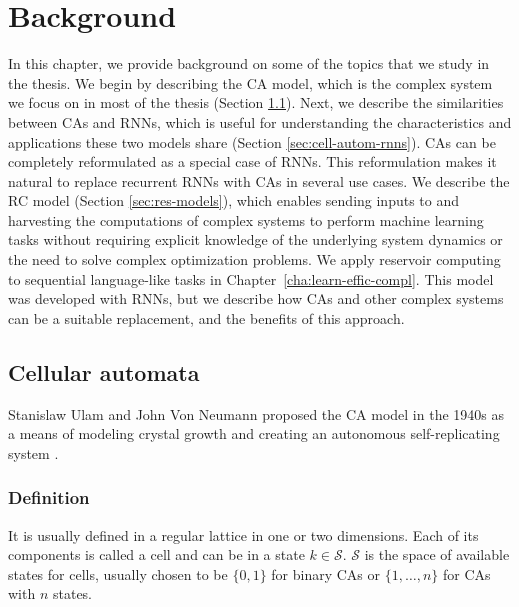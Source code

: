 \chapter{Background}
\label{cha:background}

In this chapter, we provide background on some of the topics that we study in the
thesis. We begin by describing the \acf{CA} model, which is the complex system
we focus on in most of the thesis (Section \ref{sec:cellular-automata-sec}).
Next, we describe the similarities between \acp{CA} and \acfp{RNN}, which is
useful for understanding the characteristics and applications these two models
share (Section \ref{sec:cell-autom-rnns}). \acp{CA} can be completely reformulated 
as a special case of \acp{RNN}. This reformulation makes it natural to replace 
recurrent \acp{RNN} with \acp{CA} in several use cases. We
describe the \acf{RC} model (Section \ref{sec:res-models}), which enables
sending inputs to and harvesting the computations of complex systems to perform machine learning tasks without requiring explicit knowledge of the underlying system dynamics or the need to solve complex optimization problems.
 We apply reservoir computing to sequential language-like tasks in Chapter~\ref{cha:learn-effic-compl}. This model was
developed with \acp{RNN}, but we describe how \acp{CA} and other complex systems
can be a suitable replacement, and the benefits of this approach.

\section{Cellular automata}\label{sec:cellular-automata-sec}

Stanislaw Ulam and John Von
Neumann proposed the \ac{CA} model in the 1940s as a means 
of modeling crystal growth and creating an autonomous self-replicating system
\parencite{vonneumannTheorySelfreproducingAutomata1966}.

\subsection{Definition}\label{sec:definition}
It is usually defined in a regular lattice in one or two dimensions. Each of its
components is called a cell and can be in a state $k \in \mathcal{S}$. $\mathcal{S}$ is the space of
available states for cells, usually chosen to be $\{0, 1\}$ for binary
\acp{CA} or $\{1, \ldots, n\}$ for \acp{CA} with $n$ states.

